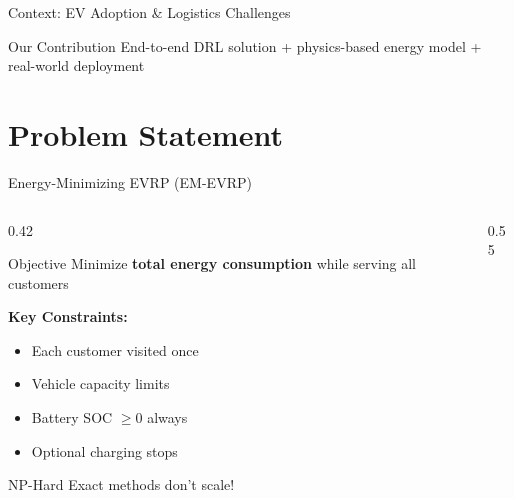 \documentclass[aspectratio=169,11pt]{beamer}
\begin{document}
\begin{frame}{Context: EV Adoption \& Logistics Challenges}
    \vspace{0.4cm}
    \begin{exampleblock}{Our Contribution}
        \centering
        End-to-end DRL solution + physics-based energy model + real-world deployment
    \end{exampleblock}
\end{frame}

\section{Problem Statement}

\begin{frame}{Energy-Minimizing EVRP (EM-EVRP)}
    \begin{columns}[T]
        \begin{column}{0.42\textwidth}
            \begin{block}{Objective}
                Minimize \textbf{total energy consumption} while serving all customers
            \end{block}

            \vspace{0.3cm}
            \textbf{Key Constraints:}
            \begin{itemize}
                \item Each customer visited once
                \item Vehicle capacity limits
                \item Battery SOC $\geq 0$ always
                \item Optional charging stops
            \end{itemize}

            \vspace{0.3cm}
            \begin{alertblock}{NP-Hard}
                Exact methods don't scale!
            \end{alertblock}
        \end{column}
        \begin{column}{0.55\textwidth}
            \begin{center}
\end{center}
\end{column}
\end{columns}
\end{frame}
\end{document}
